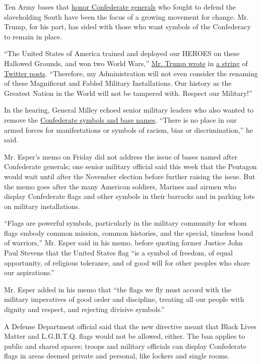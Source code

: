 Ten Army bases that
\href{https://www.nytimes.com/2020/06/11/us/military-bases-confederates.html}{honor
Confederate generals} who fought to defend the slaveholding South have
been the focus of a growing movement for change. Mr. Trump, for his
part, has sided with those who want symbols of the Confederacy to remain
in place.

``The United States of America trained and deployed our HEROES on these
Hallowed Grounds, and won two World Wars,''
\href{https://twitter.com/realDonaldTrump/status/1270787974880526337}{Mr.
Trump wrote} in
\href{https://twitter.com/realDonaldTrump/status/1270787975719391233}{a
string} of
\href{https://twitter.com/realDonaldTrump/status/1270787978626052096}{Twitter
posts}. ``Therefore, my Administration will not even consider the
renaming of these Magnificent and Fabled Military Installations. Our
history as the Greatest Nation in the World will not be tampered with.
Respect our Military!''

In the hearing, General Milley echoed senior military leaders who also
wanted to remove the
\href{https://www.nytimes.com/2020/07/20/us/politics/congress-trump-confederate-base-names.html}{Confederate
symbols and base names}. ``There is no place in our armed forces for
manifestations or symbols of racism, bias or discrimination,'' he said.

Mr. Esper's memo on Friday did not address the issue of bases named
after Confederate generals; one senior military official said this week
that the Pentagon would wait until after the November election before
further raising the issue. But the memo goes after the many American
soldiers, Marines and airmen who display Confederate flags and other
symbols in their barracks and in parking lots on military installations.

``Flags are powerful symbols, particularly in the military community for
whom flags embody common mission, common histories, and the special,
timeless bond of warriors,'' Mr. Esper said in his memo, before quoting
former Justice John Paul Stevens that the United States flag ``is a
symbol of freedom, of equal opportunity, of religious tolerance, and of
good will for other peoples who share our aspirations.''

Mr. Esper added in his memo that ``the flags we fly must accord with the
military imperatives of good order and discipline, treating all our
people with dignity and respect, and rejecting divisive symbols.''

A Defense Department official said that the new directive meant that
Black Lives Matter and L.G.B.T.Q. flags would not be allowed, either.
The ban applies to public and shared spaces; troops and military
officials can display Confederate flags in areas deemed private and
personal, like lockers and single rooms.

